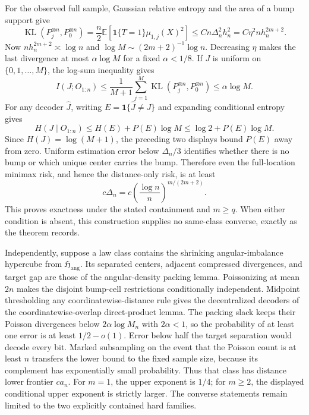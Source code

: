 For the observed full sample, Gaussian relative entropy and the area of a bump support give
\[
 \operatorname{KL}(P_j^{\otimes n},P_0^{\otimes n})
 =\frac n2\mathbb E\!\left[
 \mathbf1\{T=1\}\mu_{1,j}(X)^2\right]
 \leq Cn\Delta_n^2h_n^2
 =C\eta^2nh_n^{2m+2}.
\]
Now \(nh_n^{2m+2}\asymp\log n\) and \(\log M\sim(2m+2)^{-1}\log n\).  Decreasing \(\eta\) makes the last divergence at most \(\alpha\log M\) for a fixed \(\alpha<1/8\).  If \(J\) is uniform on \(\{0,1,\ldots,M\}\), the log-sum inequality gives
\[
 I(J;O_{1:n})
 \leq\frac1{M+1}\sum_{j=1}^M
 \operatorname{KL}(P_j^{\otimes n},P_0^{\otimes n})
 \leq\alpha\log M.
\]
For any decoder \(\widehat J\), writing \(E=\mathbf1\{\widehat J\neq J\}\) and expanding conditional entropy gives
\[
 H(J\mid O_{1:n})\leq H(E)+P(E)\log M
 \leq\log2+P(E)\log M.
\]
Since \(H(J)=\log(M+1)\), the preceding two displays bound \(P(E)\) away from zero.  Uniform estimation error below \(\Delta_n/3\) identifies whether there is no bump or which unique center carries the bump.  Therefore even the full-location minimax risk, and hence the distance-only risk, is at least
\[
 c\Delta_n
 =c\left(\frac{\log n}{n}\right)^{m/(2m+2)}.
\]
This proves exactness under the stated containment and \(m\geq q\).  When either condition is absent, this construction supplies no same-class converse, exactly as the theorem records.

Independently, suppose a law class contains the shrinking angular-imbalance hypercube from \(\mathfrak H_{\mathrm{ang}}\).  Its separated centers, adjacent compressed divergences, and target gap are those of the angular-density packing lemma.  Poissonizing at mean \(2n\) makes the disjoint bump-cell restrictions conditionally independent.  Midpoint thresholding any coordinatewise-distance rule gives the decentralized decoders of the coordinatewise-overlap direct-product lemma.  The packing slack keeps their Poisson divergences below \(2\alpha\log M_n\) with \(2\alpha<1\), so the probability of at least one error is at least \(1/2-o(1)\).  Error below half the target separation would decode every bit.  Marked subsampling on the event that the Poisson count is at least \(n\) transfers the lower bound to the fixed sample size, because its complement has exponentially small probability.  Thus that class has distance lower frontier \(ca_n\).  For \(m=1\), the upper exponent is \(1/4\); for \(m\geq2\), the displayed conditional upper exponent is strictly larger.  The converse statements remain limited to the two explicitly contained hard families.

